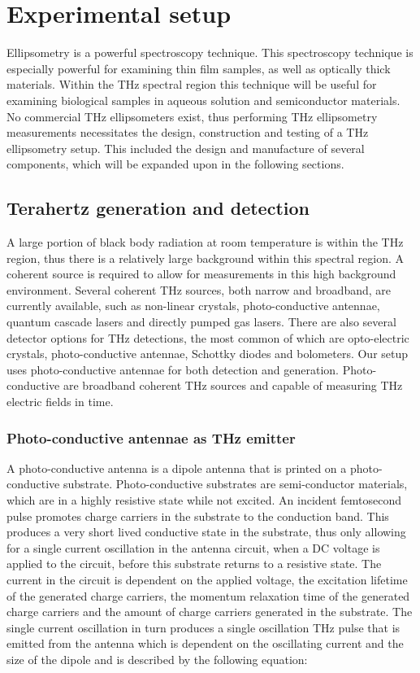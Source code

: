 \chapter{Experimental setup}
\label{chp:Setup}

Ellipsometry is a powerful spectroscopy technique. This spectroscopy technique is especially powerful for examining thin film samples, as well as optically thick materials. Within the THz spectral region this technique will be useful for examining biological samples in aqueous solution and semiconductor materials. No commercial THz ellipsometers exist, thus performing THz ellipsometry measurements necessitates the design, construction and testing of a THz ellipsometry setup. This included the design and manufacture of several components, which will be expanded upon in the following sections.

\section{Terahertz generation and detection}
\label{sec: Tera}

A large portion of black body radiation at room temperature is within the THz region, thus there is a relatively large background within this spectral region. A coherent source is required to allow for measurements in this high background environment.
Several coherent THz sources, both narrow and broadband, are currently available, such as non-linear crystals, photo-conductive antennae, quantum cascade lasers and directly pumped gas lasers. There are also several detector options for THz detections, the most common of which are opto-electric crystals, photo-conductive antennae, Schottky diodes and bolometers. Our setup uses photo-conductive antennae for both detection and generation. Photo-conductive are broadband coherent THz sources and capable of measuring THz electric fields in time.

\subsection{Photo-conductive antennae as THz emitter}
\label{sub: ant}
A photo-conductive antenna is a dipole antenna that is printed on a photo-conductive substrate. Photo-conductive substrates are semi-conductor materials, which are in a highly resistive state while not excited. An incident femtosecond pulse promotes charge carriers in the substrate to the conduction band. This produces a very short lived conductive state in the substrate, thus only allowing for a single current oscillation in the antenna circuit, when a DC voltage is applied to the circuit, before this substrate returns to a resistive state. The current in the circuit is dependent on the applied voltage, the excitation lifetime of the generated charge carriers, the momentum relaxation time of the generated charge carriers and the amount of charge carriers generated in the substrate. The single current oscillation in turn produces a single oscillation THz pulse that is emitted from the antenna which is dependent on the oscillating current and the size of the dipole and is described by the following equation: \cite{Sakai-2005}

